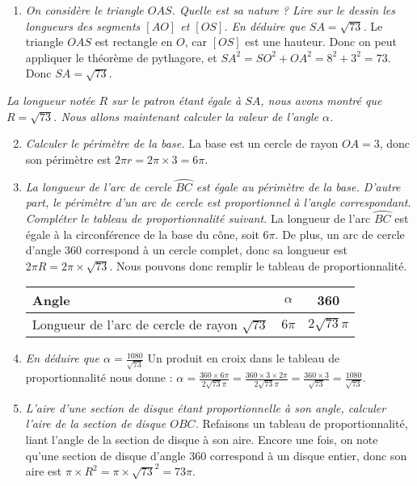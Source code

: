\documentclass[10pt]{article}
\begin{document}
\begin{exercice}
  \begin{enumerate}
    \item \emph{On considère le triangle $OAS$. Quelle est sa nature ? Lire sur le dessin les longueurs des segments $[AO]$ et $[OS]$. En déduire que $SA=\sqrt{73}$.} Le triangle $OAS$ est rectangle en $O$, car $[OS]$ est une hauteur. Donc on peut appliquer le théorème de pythagore, et $SA^2=SO^2+OA^2=8^2+3^2=73$. Donc $SA=\sqrt{73}$.
  \end{enumerate}
  \emph{La longueur notée $R$ sur le patron étant égale à $SA$, nous avons montré que $R=\sqrt{73}$. Nous allons maintenant calculer la valeur de l'angle $\alpha$.}
  \begin{enumerate}
      \setcounter{enumi}{1}
    \item \emph{Calculer le périmètre de la base.} La base est un cercle de rayon $OA=3$, donc son périmètre est $2\pi r=2\pi\times3=6\pi$.
    \item \emph{La longueur de l'arc de cercle $\wideparen{BC}$ est égale au périmètre de la base. D'autre part, le périmètre d'un arc de cercle est proportionnel à l'angle correspondant. Compléter le tableau de proportionnalité suivant.} La longueur de l'arc $\wideparen{BC}$ est égale à la circonférence de la base du cône, soit $6\pi$. De plus, un arc de cercle d'angle 360 correspond à un cercle complet, donc sa longueur est $2\pi R=2\pi\times\sqrt{73}$. Nous pouvons donc remplir le tableau de proportionnalité.

      \begin{center}
      \begin{tabular}{p{10em}||c|c}
        Angle & $\alpha$ & 360 \\
        \hline
        Longueur de l'arc de cercle de rayon $\sqrt{73}$ & $6\pi$& $2\sqrt{73}\pi$\\
      \end{tabular}
    \end{center}

  \item \emph{En déduire que $\alpha=\frac{1080}{\sqrt{73}}$}
    Un produit en croix dans le tableau de proportionnalité nous donne : $\alpha=\frac{360\times6\pi}{2\sqrt{73}\pi}=\frac{360\times 3\times2\pi}{2\sqrt{73}\pi}=\frac{360\times3}{\sqrt{73}}=\frac{1080}{\sqrt{73}}$.
  \item \emph{L'aire d'une section de disque étant proportionnelle à son angle, calculer l'aire de la section de disque $OBC$.}
    Refaisons un tableau de proportionnalité, liant l'angle de la section de disque à son aire. Encore une fois, on note qu'une section de disque d'angle 360 correspond à un disque entier, donc son aire est $\pi\times R^2=\pi\times\sqrt{73}^2=73\pi$.


\end{enumerate}
\end{exercice}
\end{document}
